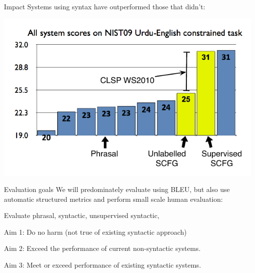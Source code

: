 \documentclass{beamer}
\newenvironment{unpacked_itemize}{
\begin{itemize}
  \setlength{\itemsep}{10pt}
  \setlength{\parskip}{0pt}
  \setlength{\parsep}{0pt}
}{\end{itemize}}
\begin{document}
\begin{frame}[t]{Impact}
Systems using syntax have outperformed those that didn't:
  \begin{center}
    \includegraphics[scale=1.0]{ccb_graph2.pdf}
  \end{center}
\end{frame}

\begin{frame}[t]{Evaluation goals}
We will predominately evaluate using BLEU, but also use automatic structured metrics and perform small scale human evaluation:
\vspace{0.25in}
\begin{unpacked_itemize}
\item Evaluate phrasal, syntactic, unsupervised syntactic,
\item Aim 1: Do no harm (not true of existing syntactic approach)
\item Aim 2: Exceed the performance of current non-syntactic systems.
\item Aim 3: Meet or exceed performance of existing syntactic systems.
\end{unpacked_itemize}
\end{frame}

\end{document}
